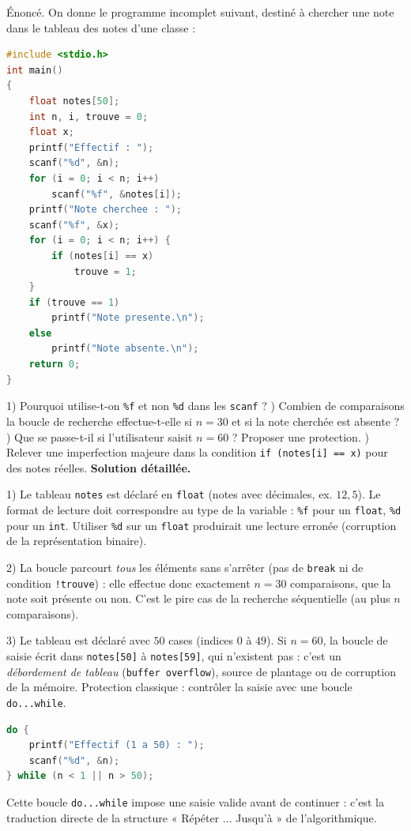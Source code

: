 \documentclass[11pt]{article}
\begin{document}
\begin{exoresolu}
Énoncé. On donne le programme incomplet suivant, destiné à chercher une note dans le tableau des notes d'une classe :
\begin{lstlisting}[language=C]
#include <stdio.h>
int main()
{
    float notes[50];
    int n, i, trouve = 0;
    float x;
    printf("Effectif : ");
    scanf("%d", &n);
    for (i = 0; i < n; i++)
        scanf("%f", &notes[i]);
    printf("Note cherchee : ");
    scanf("%f", &x);
    for (i = 0; i < n; i++) {
        if (notes[i] == x)
            trouve = 1;
    }
    if (trouve == 1)
        printf("Note presente.\n");
    else
        printf("Note absente.\n");
    return 0;
}
\end{lstlisting}
1) Pourquoi utilise-t-on \texttt{\%f} et non \texttt{\%d} dans les \texttt{scanf} ? ) Combien de comparaisons la boucle de recherche effectue-t-elle si $n = 30$ et si la note cherchée est absente ? ) Que se passe-t-il si l'utilisateur saisit $n = 60$ ? Proposer une protection. ) Relever une imperfection majeure dans la condition \texttt{if (notes[i] == x)} pour des notes réelles.
\tcblower
\textbf{Solution détaillée.}

1) Le tableau \texttt{notes} est déclaré en \texttt{float} (notes avec décimales, ex. $12{,}5$). Le format de lecture doit correspondre au type de la variable : \texttt{\%f} pour un \texttt{float}, \texttt{\%d} pour un \texttt{int}. Utiliser \texttt{\%d} sur un \texttt{float} produirait une lecture erronée (corruption de la représentation binaire).

2) La boucle parcourt \emph{tous} les éléments sans s'arrêter (pas de \texttt{break} ni de condition \texttt{!trouve}) : elle effectue donc exactement $n = 30$ comparaisons, que la note soit présente ou non. C'est le pire cas de la recherche séquentielle (au plus $n$ comparaisons).

3) Le tableau est déclaré avec $50$ cases (indices $0$ à $49$). Si $n = 60$, la boucle de saisie écrit dans \texttt{notes[50]} à \texttt{notes[59]}, qui n'existent pas : c'est un \emph{débordement de tableau} (\texttt{buffer overflow}), source de plantage ou de corruption de la mémoire. Protection classique : contrôler la saisie avec une boucle \texttt{do...while}.
\begin{lstlisting}[language=C]
do {
    printf("Effectif (1 a 50) : ");
    scanf("%d", &n);
} while (n < 1 || n > 50);
\end{lstlisting}
Cette boucle \texttt{do...while} impose une saisie valide avant de continuer : c'est la traduction directe de la structure « Répéter ... Jusqu'à » de l'algorithmique.


\end{exoresolu}
\end{document}
